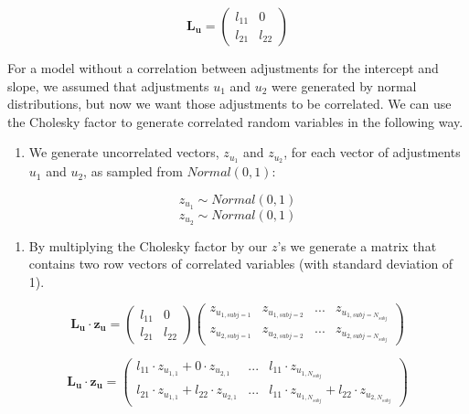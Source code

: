 \documentclass[12pt,]{krantz}
\providecommand{\tightlist}{%
  \setlength{\itemsep}{0pt}\setlength{\parskip}{0pt}}
\theoremstyle{definition}
\theoremstyle{definition}
\theoremstyle{definition}
\theoremstyle{remark}
\begin{document}
\begin{equation}
\mathbf{L_u}  =
{\begin{pmatrix} 
l_{11} & 0 \\ 
l_{21}  & l_{22}
\end{pmatrix}}
\end{equation}

For a model without a correlation between adjustments for the intercept
and slope, we assumed that adjustments \(u_{1}\) and \(u_{2}\) were
generated by normal distributions, but now we want those adjustments to
be correlated. We can use the Cholesky factor to generate correlated
random variables in the following way.

\begin{enumerate}
\def\labelenumi{\arabic{enumi}.}
\tightlist
\item
  We generate uncorrelated vectors, \(z_{u_1}\) and \(z_{u_2}\), for
  each vector of adjustments \(u_1\) and \(u_2\), as sampled from
  \(Normal(0,1)\):
\end{enumerate}

\[z_{u_1} \sim Normal(0,1)\] \[z_{u_2} \sim Normal(0,1)\]

\begin{enumerate}
\def\labelenumi{\arabic{enumi}.}
\setcounter{enumi}{1}
\tightlist
\item
  By multiplying the Cholesky factor by our \(z\)'s we generate a matrix
  that contains two row vectors of correlated variables (with standard
  deviation of 1).
\end{enumerate}

\[
  \mathbf{L_u}\cdot \mathbf{z_u}  =
  {\begin{pmatrix} 
  l_{11} & 0 \\ 
  l_{21}  & l_{22}
  \end{pmatrix}}
  {\begin{pmatrix}
  z_{u_{1,subj=1}} & z_{u_{1,subj=2}} & ... & z_{u_{1,subj=N_{subj}}} \\
  z_{u_{2,subj=1}} & z_{u_{2,subj=2}} & ... & z_{u_{2,subj=N_{subj}}}
  \end{pmatrix}}
  \]

\[
  \mathbf{L_u}\cdot \mathbf{z_u}  =
  {\begin{pmatrix}
  l_{11} \cdot z_{u_{1,1}} + 0 \cdot z_{u_{2,1}} &   ... & l_{11} \cdot z_{u_{1,N_{subj}}} \\
  l_{21} \cdot z_{u_{1,1}} + l_{22} \cdot z_{u_{2,1}} & ... & l_{11} \cdot z_{u_{1,N_{subj}}} + l_{22} \cdot z_{u_{2,N_{subj}}}
  \end{pmatrix}}
  \]
\end{document}
